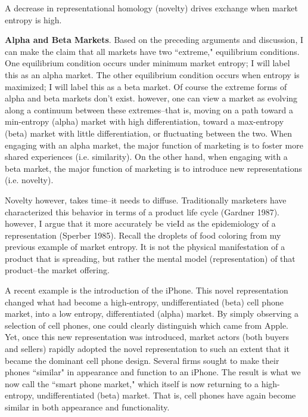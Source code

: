 \begin{prop}
A decrease in representational homology (novelty) drives exchange when market entropy is high.
\end{prop}

\textbf{Alpha and Beta Markets}.
Based on the preceding arguments and discussion, I can make the claim that all markets have two ``extreme," equilibrium conditions. One equilibrium condition occurs under minimum market entropy; I will label this as an alpha market. The other equilibrium condition occurs when entropy is maximized; I will label this as a beta market. Of course the extreme forms of alpha and beta markets don't exist. however, one can view a market as evolving along a continuum between these extremes--that is, moving on a path toward a min-entropy (alpha) market with high differentiation, toward a max-entropy (beta) market with little differentiation, or fluctuating between the two. When engaging with an alpha market, the major function of marketing is to foster more shared experiences (i.e. similarity). On the other hand, when engaging with a beta market, the major function of marketing is to introduce new representations (i.e. novelty). 
 
Novelty however, takes time--it needs to diffuse. Traditionally marketers have characterized this behavior in terms of a product life cycle (Gardner 1987). however, I argue that it more accurately be vieId as the epidemiology of a representation (Sperber 1985). Recall the droplets of food coloring from my previous example of market entropy. It is not the physical manifestation of a product that is spreading, but rather the mental model (representation) of that product--the market offering. 

A recent example is the introduction of the iPhone. This novel representation changed what had become a high-entropy, undifferentiated (beta) cell phone market, into a low entropy, differentiated (alpha) market. By simply observing a selection of cell phones, one could clearly distinguish which came from Apple. Yet, once this new representation was introduced, market actors (both buyers and sellers) rapidly adopted the novel representation to such an extent that it became the dominant cell phone design. Several firms sought to make their phones ``similar" in appearance and function to an iPhone. The result is what we now call the ``smart phone market," which itself is now returning to a high-entropy, undifferentiated (beta) market. That is, cell phones have again become similar in both appearance and functionality.



